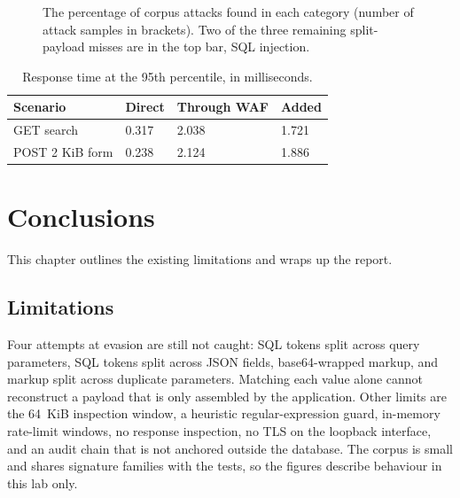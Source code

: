 \documentclass{FastFyp}
\newenvironment{rtab}{\small\singlespacing\renewcommand{\arraystretch}{1.3}}{}
\begin{document}
\begin{figure}[!htb]
\centering
{}
\caption{The percentage of corpus attacks found in each category (number of attack samples in brackets). Two of the three remaining split-payload misses are in the top bar, SQL injection.}
\label{fig:cov}
\end{figure}

\begin{table}[!htb]
\centering
\caption{Response time at the 95th percentile, in milliseconds.}
\begin{rtab}
\begin{tabular}{|p{4.2cm}|p{2.4cm}|p{2.9cm}|p{2.4cm}|}
\hline
\textbf{Scenario} & \textbf{Direct} & \textbf{Through WAF} & \textbf{Added} \\
\hline
GET search & 0.317 & 2.038 & 1.721 \\
\hline
POST 2 KiB form & 0.238 & 2.124 & 1.886 \\
\hline
\end{tabular}
\end{rtab}
\label{tab:latency}
\end{table}

\chapter{Conclusions}
This chapter outlines the existing limitations and wraps up the report.

\section{Limitations}
Four attempts at evasion are still not caught: SQL tokens split across query parameters, SQL tokens split across JSON fields, base64-wrapped markup, and markup split across duplicate parameters. Matching each value alone cannot reconstruct a payload that is only assembled by the application. Other limits are the 64~KiB inspection window, a heuristic regular-expression guard, in-memory rate-limit windows, no response inspection, no TLS on the loopback interface, and an audit chain that is not anchored outside the database. The corpus is small and shares signature families with the tests, so the figures describe behaviour in this lab only.
\end{document}
